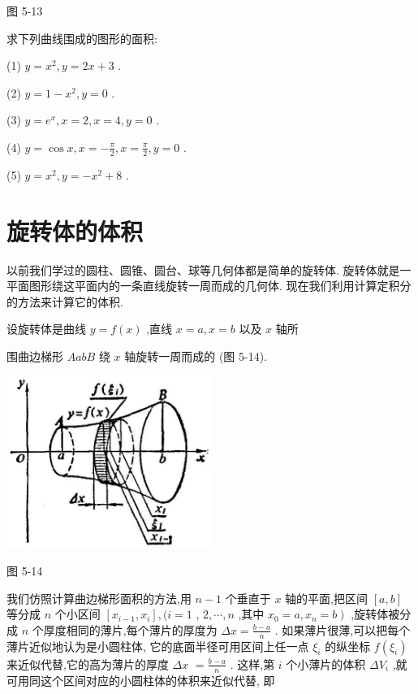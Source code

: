 \documentclass[lang=cn,newtx,10pt,scheme=chinese]{elegantbook}
\begin{document}
图 5-13

\begin{problemset}[练习]

\item 求下列曲线围成的图形的面积:

(1) \(y = {x}^{2},y = {2x} + 3\) .

(2) \(y = 1 - {x}^{2},y = 0\) .

(3) \(y = {e}^{x},x = 2,x = 4,y = 0\) .

(4) \(y = \cos x,x = - \frac{\pi }{2},x = \frac{\pi }{2},y = 0\) .

(5) \(y = {x}^{2},y = - {x}^{2} + 8\) .

\end{problemset}

\section{旋转体的体积}

以前我们学过的圆柱、圆锥、圆台、球等几何体都是简单的旋转体. 旋转体就是一平面图形绕这平面内的一条直线旋转一周而成的几何体. 现在我们利用计算定积分的方法来计算它的体积.

设旋转体是曲线 \(y = f\left( x\right)\) ,直线 \(x = a,x = b\) 以及 \(x\) 轴所

围曲边梯形 \({AabB}\) 绕 \(x\) 轴旋转一周而成的 (图 5-14).

\begin{center}
\includegraphics[max width=0.5\textwidth]{images/01912c18-5c3f-733d-b775-749ba9897a9d_236_380755.jpg}
\end{center}

图 5-14

我们仿照计算曲边梯形面积的方法,用 \(n - 1\) 个垂直于 \(x\) 轴的平面,把区间 \(\left\lbrack {a,b}\right\rbrack\) 等分成 \(n\) 个小区间 \(\left\lbrack {{x}_{i - 1},{x}_{i}}\right\rbrack ,(i = 1\) , \(2,\cdots ,n\) ,其中 \(\left. {{x}_{0} = a,{x}_{n} = b}\right)\) ,旋转体被分成 \(n\) 个厚度相同的薄片,每个薄片的厚度为 \({\Delta x} = \frac{b - a}{n}\) . 如果薄片很薄,可以把每个薄片近似地认为是小圆柱体, 它的底面半径可用区间上任一点 \({\xi }_{i}\) 的纵坐标 \(f\left( {\xi }_{i}\right)\) 来近似代替,它的高为薄片的厚度 \({\Delta x}\) \(= \frac{b - a}{n}\) . 这样,第 \(i\) 个小薄片的体积 \(\Delta {V}_{i}\) ,就可用同这个区间对应的小圆柱体的体积来近似代替, 即
\end{document}
